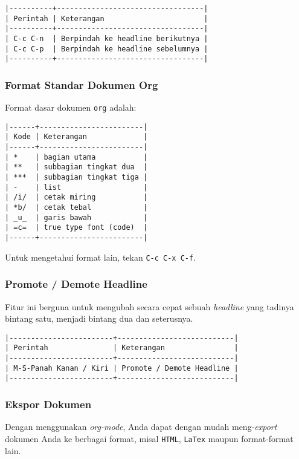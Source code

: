 \documentclass{article}
\begin{document}
\begin{verbatim}
|----------+----------------------------------|
| Perintah | Keterangan                       |
|----------+----------------------------------|
| C-c C-n  | Berpindah ke headline berikutnya |
| C-c C-p  | Berpindah ke headline sebelumnya |
|----------+----------------------------------|
\end{verbatim}

\subsubsection{Format Standar Dokumen Org}

Format dasar dokumen \verb=org= adalah:

\begin{verbatim}
|------+------------------------|
| Kode | Keterangan             |
|------+------------------------|
| *    | bagian utama           |
| **   | subbagian tingkat dua  |
| ***  | subbagian tingkat tiga |
| -    | list                   |
| /i/  | cetak miring           |
| *b/  | cetak tebal            |
| _u_  | garis bawah            |
| =c=  | true type font (code)  |
|------+------------------------|
\end{verbatim}

Untuk mengetahui format lain, tekan \texttt{C-c C-x C-f}.

\subsubsection{Promote / Demote Headline}
Fitur ini berguna untuk mengubah secara cepat sebuah \emph{headline} yang
tadinya bintang satu, menjadi bintang dua dan seterusnya.

\begin{verbatim}
|------------------------+---------------------------|
| Perintah               | Keterangan                |
|------------------------+---------------------------|
| M-S-Panah Kanan / Kiri | Promote / Demote Headline |
|------------------------+---------------------------|
\end{verbatim}

\subsubsection{Ekspor Dokumen}
Dengan menggunakan \emph{org-mode}, Anda dapat dengan mudah meng-\emph{export}
dokumen Anda ke berbagai format, misal \verb=HTML=, \verb=LaTex= maupun 
format-format lain.
\end{document}
